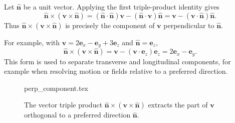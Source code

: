 \begin{example}
Let $\hat{\mathbf{n}}$ be a unit vector. Applying the first triple-product identity gives
\begin{equation}
\hat{\mathbf{n}}\times(\mathbf{v}\times\hat{\mathbf{n}})
=(\hat{\mathbf{n}}\cdot\hat{\mathbf{n}})\mathbf{v}
-(\hat{\mathbf{n}}\cdot\mathbf{v})\hat{\mathbf{n}}
=\mathbf{v}-(\mathbf{v}\cdot\hat{\mathbf{n}})\hat{\mathbf{n}}.
\end{equation}
Thus $\hat{\mathbf{n}}\times(\mathbf{v}\times\hat{\mathbf{n}})$ is precisely the component of $\mathbf{v}$ perpendicular to $\hat{\mathbf{n}}$.

For example, with $\mathbf{v}=2\mathbf{e}_x-\mathbf{e}_y+3\mathbf{e}_z$ and $\hat{\mathbf{n}}=\mathbf{e}_z$,
\begin{equation}
\hat{\mathbf{n}}\times(\mathbf{v}\times\hat{\mathbf{n}})
=\mathbf{v}-(\mathbf{v}\cdot\mathbf{e}_z)\mathbf{e}_z
=2\mathbf{e}_x-\mathbf{e}_y.
\end{equation}
This form is used to separate transverse and longitudinal components, for example when resolving motion or fields relative to a preferred direction.
\end{example}

\begin{figure}[htb]
    \centering
    {perp_component.tex}
    \caption{The vector triple product $\hat{\mathbf{n}}\times(\mathbf{v}\times\hat{\mathbf{n}})$ extracts the part of $\mathbf{v}$ orthogonal to a preferred direction $\hat{\mathbf{n}}$.}
    \label{fig:vec-perp}
\end{figure}



